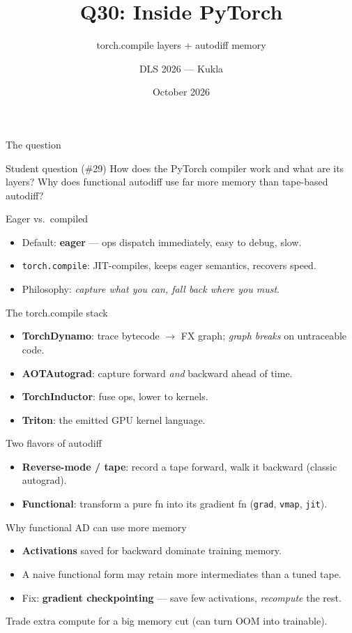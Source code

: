 \documentclass[aspectratio=169,10pt]{beamer}
\title{Q30: Inside PyTorch}
\subtitle{torch.compile layers + autodiff memory}
\author{DLS 2026 --- Kukla}
\date{October 2026}
\begin{document}
\maketitle

\begin{frame}{The question}
\begin{block}{Student question (\#29)}
How does the PyTorch compiler work and what are its layers? Why does functional autodiff use far more
memory than tape-based autodiff?
\end{block}
\end{frame}
\begin{frame}{Eager vs.\ compiled}
\begin{itemize}
\item Default: \textbf{eager} --- ops dispatch immediately, easy to debug, slow.
\item \texttt{torch.compile}: JIT-compiles, keeps eager semantics, recovers speed.
\item Philosophy: \emph{capture what you can, fall back where you must}.
\end{itemize}
\end{frame}
\begin{frame}{The torch.compile stack}
\begin{itemize}
\item \textbf{TorchDynamo}: trace bytecode $\to$ FX graph; \emph{graph breaks} on untraceable code.
\item \textbf{AOTAutograd}: capture forward \emph{and} backward ahead of time.
\item \textbf{TorchInductor}: fuse ops, lower to kernels.
\item \textbf{Triton}: the emitted GPU kernel language.
\end{itemize}
\end{frame}
\begin{frame}{Two flavors of autodiff}
\begin{itemize}
\item \textbf{Reverse-mode / tape}: record a tape forward, walk it backward (classic autograd).
\item \textbf{Functional}: transform a pure fn into its gradient fn (\texttt{grad}, \texttt{vmap}, \texttt{jit}).
\end{itemize}
\end{frame}
\begin{frame}{Why functional AD can use more memory}
\begin{itemize}
\item \textbf{Activations} saved for backward dominate training memory.
\item A naive functional form may retain more intermediates than a tuned tape.
\item Fix: \textbf{gradient checkpointing} --- save few activations, \emph{recompute} the rest.
\end{itemize}
\alert{Trade extra compute for a big memory cut (can turn OOM into trainable).}
\end{frame}
\end{document}
